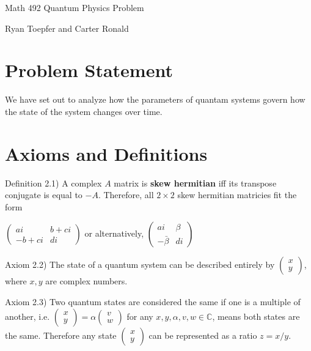 \documentclass[10pt]{article}
\begin{document}
\begin{center}\Large Math 492 Quantum Physics Problem\end{center}
\begin{center}\large Ryan Toepfer and Carter Ronald\end{center}

\section{Problem Statement}
We have set out to analyze how the parameters of quantam systems govern how the state of the system changes over time.

\section{Axioms and Definitions}

Definition 2.1) A complex $A$ matrix is \textbf{skew hermitian} iff its transpose conjugate is equal to $-A$.
Therefore, all $2\times2$ skew hermitian matricies fit the form
\begin{center}
$\begin{pmatrix}ai&b+ci\\-b+ci&di\end{pmatrix}$
or alternatively, 
$\begin{pmatrix}ai&\beta\\-\bar\beta&di\end{pmatrix}$
\end{center}

Axiom 2.2) The state of a quantum system can be described entirely by $\begin{pmatrix}x\\y\end{pmatrix}$, where $x,y$ are complex numbers. 

Axiom 2.3) Two quantum states are considered the same if one is a multiple of another, i.e. $\begin{pmatrix}x\\y\end{pmatrix}=\alpha\begin{pmatrix}v\\w\end{pmatrix}$ for any $x,y,\alpha,v,w\in\mathbb C$, means both states are the same.
Therefore any state $\begin{pmatrix}x\\y\end{pmatrix}$ can be represented as a ratio $z=x/y$.
\end{document}
